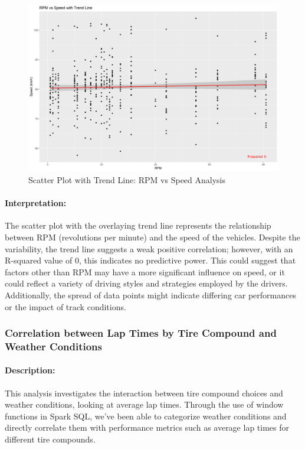 \documentclass{article}
\begin{document}
\begin{figure}[H]
    \centering
    \includegraphics[width=\textwidth]{avg_speed_vs_rpm.png}
    \caption{Scatter Plot with Trend Line: RPM vs Speed Analysis}
\end{figure}

\paragraph{Interpretation:}
The scatter plot with the overlaying trend line represents the relationship between RPM (revolutions per minute) and the speed of the vehicles. Despite the variability, the trend line suggests a weak positive correlation; however, with an R-squared value of 0, this indicates no predictive power. This could suggest that factors other than RPM may have a more significant influence on speed, or it could reflect a variety of driving styles and strategies employed by the drivers. Additionally, the spread of data points might indicate differing car performances or the impact of track conditions.



\subsubsection{Correlation between Lap Times by Tire Compound and Weather Conditions}
\paragraph{Description:}
This analysis investigates the interaction between tire compound choices and weather conditions, looking at average lap times. Through the use of window functions in Spark SQL, we've been able to categorize weather conditions and directly correlate them with performance metrics such as average lap times for different tire compounds.
\end{document}
